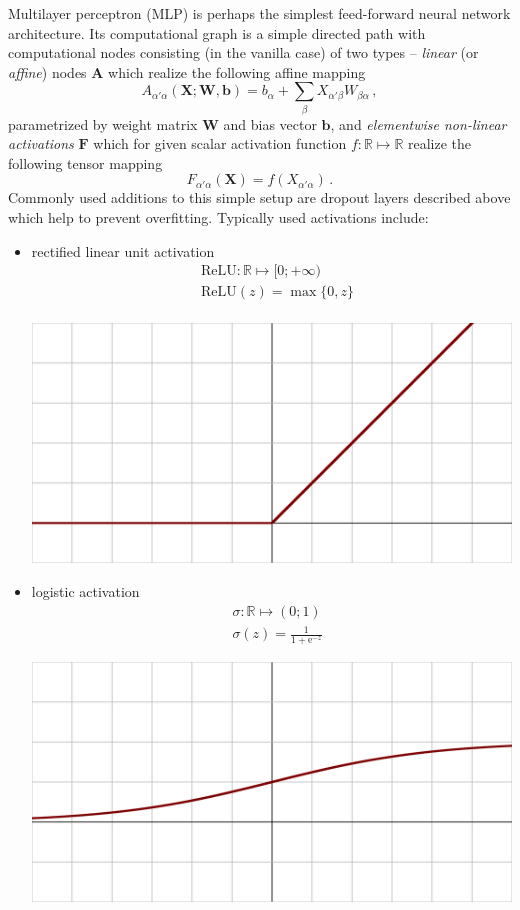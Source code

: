 \documentclass[a5paper]{article}
\newcommand{\Rbb}{\mathbb{R}}
\newcommand{\e}{\mathrm{e}}
\begin{document}
Multilayer perceptron (MLP) is perhaps the simplest feed-forward neural network architecture. Its
computational graph is a simple directed path with computational nodes consisting (in the vanilla
case) of two types -- \emph{linear} (or \emph{affine}) nodes $\bm{A}$ which realize the following
affine mapping
\[
   A_{\alpha'\alpha}(\bm{X}; \bm{W}, \bm{b}) = b_\alpha + \sum_\beta X_{\alpha'\beta} W_{\beta\alpha}\,,
\]
parametrized by weight matrix $\bm{W}$ and bias vector $\bm{b}$, and \emph{elementwise non-linear
activations} $\bm{F}$ which for given scalar activation function $f: \Rbb \mapsto \Rbb$ realize the
following tensor mapping
\[
   F_{\alpha'\alpha}(\bm{X}) = f(X_{\alpha'\alpha})\,.
\]
Commonly used additions to this simple setup are dropout layers described above which help to
prevent overfitting. Typically used activations include:
\begin{itemize}
   \item rectified linear unit activation
   \[
   \begin{split}
      &\text{ReLU}: \Rbb \mapsto [0; +\infty)\\
      &\text{ReLU}(z) = \max\{0,z\}\\
   \end{split}
   \]
   \begin{center}
   \includegraphics[width=0.5\columnwidth]{figs/Activation_rectified_linear.svg.png}
   \end{center}
   
   \item logistic activation
   \[
   \begin{split}
      &\sigma: \Rbb \mapsto (0;1)\\
      &\sigma(z) = \frac{1}{1 + \e^{-z}}
   \end{split}
   \]
   \begin{center}
   \includegraphics[width=0.5\columnwidth]{figs/Activation_logistic.svg.png}
   \end{center}


\end{itemize}
\end{document}
